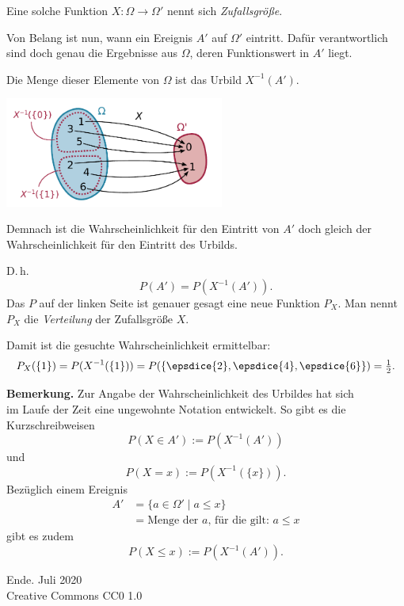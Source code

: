\documentclass[9pt]{beamer}
\newcommand{\modest}[1]{{\small\color{gray}#1}}
\newcommand{\strong}[1]{\textsf{\textbf{#1}}}
\newcommand{\parspace}{\vspace{0.8em}}
\newcommand\dice[1]{\vcenter{\hbox{\epsdice{#1}}}}
\begin{document}
\begin{frame}[t]
\vspace{3em}
Eine solche Funktion $X\colon\Omega\to\Omega'$ nennt sich
\emph{Zufallsgröße}.\pause

\parspace
Von Belang ist nun, wann ein Ereignis $A'$ auf $\Omega'$ eintritt.
Dafür verantwortlich sind doch genau die Ergebnisse aus $\Omega$,
deren Funktionswert in $A'$ liegt.\pause

\parspace
Die Menge dieser Elemente von $\Omega$ ist das Urbild $X^{-1}(A')$.\pause

\begin{center}
\includegraphics[width=72mm]{img/preimage.pdf}
\end{center}
\end{frame}

\begin{frame}
Demnach ist die Wahrscheinlichkeit für den Eintritt von $A'$ doch
gleich der Wahrscheinlichkeit für den Eintritt des Urbilds.\pause

\parspace
D.\,h.
\[P(A') = P(X^{-1}(A')).\]\pause
Das $P$ auf der linken Seite ist genauer gesagt eine neue Funktion $P_X$.
Man nennt $P_X$ die \emph{Verteilung} der Zufallsgröße $X$.
\end{frame}

\begin{frame}
Damit ist die gesuchte Wahrscheinlichkeit ermittelbar:
\[P_X(\{1\}) = P(X^{-1}(\{1\})) = P(\{\dice{2},\dice{4},\dice{6}\})
 = \tfrac{1}{2}.\]
\end{frame}

\begin{frame}
\strong{Bemerkung.} Zur Angabe der Wahrscheinlichkeit des Urbildes hat
sich\\
im Laufe der Zeit eine ungewohnte Notation entwickelt. So gibt es
die Kurzschreibweisen
\[P(X\in A') := P(X^{-1}(A'))\]
und
\[P(X=x) := P(X^{-1}(\{x\})).\]\pause
Bezüglich einem Ereignis
\begin{align*}A' &= \{a\in\Omega'\mid a\le x\}\\
&= \text{Menge der $a$, für die gilt: $a\le x$}
\end{align*}
gibt es zudem
\[P(X\le x) := P(X^{-1}(A')).\]
\end{frame}

\begin{frame}
Ende.
\vfill\hfill\modest{Juli 2020}\\
\hfill\modest{Creative Commons CC0 1.0}
\end{frame}
\end{document}
